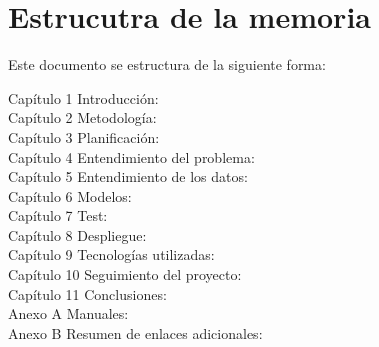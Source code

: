 \section{Estrucutra de la memoria} \label{sec.estr-memoria}

Este documento se estructura de la siguiente forma:
\begin{description}
\item[Capítulo 1 Introducción:]
\item[Capítulo 2 Metodología:] 
\item[Capítulo 3 Planificación:]
\item[Capítulo 4 Entendimiento del problema:]
\item[Capítulo 5 Entendimiento de los datos:]
\item[Capítulo 6 Modelos:]
\item[Capítulo 7 Test:]
\item[Capítulo 8 Despliegue:]
\item[Capítulo 9 Tecnologías utilizadas:]
\item[Capítulo 10 Seguimiento del proyecto:]
\item[Capítulo 11 Conclusiones:]
\item[Anexo A Manuales:]
\item[Anexo B Resumen de enlaces adicionales:]
\end{description}
